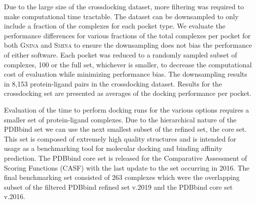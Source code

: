 \documentclass[journal=jcisd8,manuscript=article]{achemso}
\begin{document}
Due to the large size of the crossdocking dataset, more filtering was required to make computational time tractable. The dataset can be downsampled to only include a fraction of the complexes for each pocket type. We evaluate the performance differences for various fractions of the total complexes per pocket for both \textsc{Gnina} and \textsc{Smina} to ensure the downsampling does not bias the performance of either software. Each pocket was reduced to a randomly sampled subset of complexes, 100 or the full set, whichever is smaller, to decrease the computational cost of evaluation while minimizing performance bias. The downsampling results in 8,153 protein-ligand pairs in the crossdocking dataset. Results for the crossdocking set are presented as averages of the docking performance per pocket.

Evaluation of the time to perform docking runs for the various options requires a smaller set of protein-ligand complexes. Due to the hierarchical nature of the PDBbind set we can use the next smallest subset of the refined set, the core set. This set is composed of extremely high quality structures and is intended for usage as a benchmarking tool for molecular docking and binding affinity prediction. The PDBbind core set is released for the Comparative Assessment of Scoring Functions (CASF) with the last update to the set occurring in 2016\cite{su2018comparative}. The final benchmarking set consisted of 263 complexes which were the overlapping subset of the filtered PDBbind refined set v.2019 and the PDBbind core set v.2016.
\end{document}
